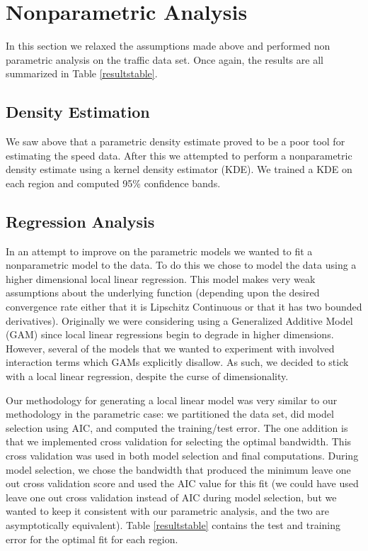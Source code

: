 \documentclass[12pt]{article}
\begin{document}
\section{Nonparametric Analysis}
In this section we relaxed the assumptions made above and performed non parametric analysis on the traffic data set. Once again, the results are all summarized in Table \ref{resultstable}.
\subsection{Density Estimation}
We saw above that a parametric density estimate proved to be a poor tool for estimating the speed data. After this we attempted to perform a nonparametric density estimate using a kernel density estimator (KDE). We trained a KDE on each region and computed 95\% confidence bands.
\subsection{Regression Analysis}
In an attempt to improve on the parametric models we wanted to fit a nonparametric model to the data. To do this we chose to model the data using a higher dimensional local linear regression. This model makes very weak assumptions about the underlying function (depending upon the desired convergence rate either that it is Lipschitz Continuous or that it has two bounded derivatives). Originally we were considering using a Generalized Additive Model (GAM) since local linear regressions begin to degrade in higher dimensions. However, several of the models that we wanted to experiment with involved interaction terms which GAMs explicitly disallow. As such, we decided to stick with a local linear regression, despite the curse of dimensionality.

Our methodology for generating a local linear model was very similar to our methodology in the parametric case: we partitioned the data set, did model selection using AIC, and computed the training/test error. The one addition is that we implemented cross validation for selecting the optimal bandwidth. This cross validation was used in both model selection and final computations. During model selection, we chose the bandwidth that produced the minimum leave one out cross validation score and used the AIC value for this fit (we could have used leave one out cross validation instead of AIC during model selection, but we wanted to keep it consistent with our parametric analysis, and the two are asymptotically equivalent). Table \ref{resultstable} contains the test and training error for the optimal fit for each region.
\end{document}
